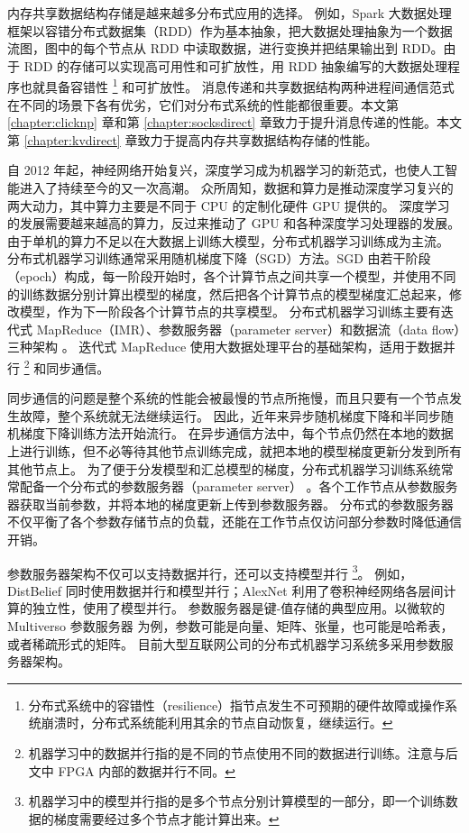 内存共享数据结构存储是越来越多分布式应用的选择。
例如，Spark \cite{zaharia2010spark} 大数据处理框架以容错分布式数据集（RDD）作为基本抽象，把大数据处理抽象为一个数据流图，图中的每个节点从 RDD 中读取数据，进行变换并把结果输出到 RDD。由于 RDD 的存储可以实现高可用性和可扩放性，用 RDD 抽象编写的大数据处理程序也就具备容错性 \footnote{分布式系统中的容错性（resilience）指节点发生不可预期的硬件故障或操作系统崩溃时，分布式系统能利用其余的节点自动恢复，继续运行。} 和可扩放性。
消息传递和共享数据结构两种进程间通信范式在不同的场景下各有优劣，它们对分布式系统的性能都很重要。本文第 \ref{chapter:clicknp} 章和第 \ref{chapter:socksdirect} 章致力于提升消息传递的性能。本文第 \ref{chapter:kvdirect} 章致力于提高内存共享数据结构存储的性能。

自 2012 年起，神经网络开始复兴，深度学习成为机器学习的新范式，也使人工智能进入了持续至今的又一次高潮。
众所周知，数据和算力是推动深度学习复兴的两大动力，其中算力主要是不同于 CPU 的定制化硬件 GPU 提供的。
深度学习的发展需要越来越高的算力，反过来推动了 GPU 和各种深度学习处理器的发展。
由于单机的算力不足以在大数据上训练大模型，分布式机器学习训练成为主流。
分布式机器学习训练通常采用随机梯度下降（SGD）方法。SGD 由若干阶段（epoch）构成，每一阶段开始时，各个计算节点之间共享一个模型，并使用不同的训练数据分别计算出模型的梯度，然后把各个计算节点的模型梯度汇总起来，修改模型，作为下一阶段各个计算节点的共享模型。
分布式机器学习训练主要有迭代式 MapReduce（IMR）、参数服务器（parameter server）和数据流（data flow）三种架构 \cite{distributed-ml}。
迭代式 MapReduce 使用大数据处理平台的基础架构，适用于数据并行 \footnote{机器学习中的数据并行指的是不同的节点使用不同的数据进行训练。注意与后文中 FPGA 内部的数据并行不同。} 和同步通信。

同步通信的问题是整个系统的性能会被最慢的节点所拖慢，而且只要有一个节点发生故障，整个系统就无法继续运行。
因此，近年来异步随机梯度下降和半同步随机梯度下降训练方法开始流行。
在异步通信方法中，每个节点仍然在本地的数据上进行训练，但不必等待其他节点训练完成，就把本地的模型梯度更新分发到所有其他节点上。
为了便于分发模型和汇总模型的梯度，分布式机器学习训练系统常常配备一个分布式的参数服务器（parameter server） \cite{li2014scaling}。各个工作节点从参数服务器获取当前参数，并将本地的梯度更新上传到参数服务器。
分布式的参数服务器不仅平衡了各个参数存储节点的负载，还能在工作节点仅访问部分参数时降低通信开销。

参数服务器架构不仅可以支持数据并行，还可以支持模型并行 \footnote{机器学习中的模型并行指的是多个节点分别计算模型的一部分，即一个训练数据的梯度需要经过多个节点才能计算出来。}。
例如，DistBelief \cite{dean2012large} 同时使用数据并行和模型并行；AlexNet \cite{krizhevsky2012imagenet} 利用了卷积神经网络各层间计算的独立性，使用了模型并行。
参数服务器是键-值存储的典型应用。以微软的 Multiverso 参数服务器 \cite{multiverso} 为例，参数可能是向量、矩阵、张量，也可能是哈希表，或者稀疏形式的矩阵。
目前大型互联网公司的分布式机器学习系统多采用参数服务器架构。

